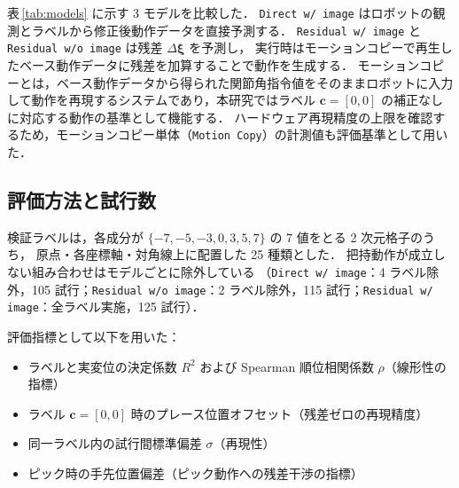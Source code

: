 表\,\ref{tab:models} に示す 3 モデルを比較した．
\texttt{Direct w/ image} はロボットの観測とラベルから修正後動作データを直接予測する．
\texttt{Residual w/ image} と \texttt{Residual w/o image} は残差 $\Delta\bm{\xi}$ を予測し，
実行時はモーションコピーで再生したベース動作データに残差を加算することで動作を生成する．
モーションコピーとは，ベース動作データから得られた関節角指令値をそのままロボットに入力して動作を再現するシステムであり，本研究ではラベル $\bm{c} = [0,0]$ の補正なしに対応する動作の基準として機能する．
ハードウェア再現精度の上限を確認するため，モーションコピー単体（\texttt{Motion Copy}）の計測値も評価基準として用いた．

\subsection{評価方法と試行数}

検証ラベルは，各成分が $\{-7, -5, -3, 0, 3, 5, 7\}$ の 7 値をとる 2 次元格子のうち，
原点・各座標軸・対角線上に配置した 25 種類とした．
把持動作が成立しない組み合わせはモデルごとに除外している
（\texttt{Direct w/ image}：4 ラベル除外，105 試行；\texttt{Residual w/o image}：2 ラベル除外，115 試行；\texttt{Residual w/ image}：全ラベル実施，125 試行）．

評価指標として以下を用いた：
\begin{itemize}
  \item ラベルと実変位の決定係数 $R^2$ および Spearman 順位相関係数 $\rho$（線形性の指標）
  \item ラベル $\bm{c} = [0,0]$ 時のプレース位置オフセット（残差ゼロの再現精度）
  \item 同一ラベル内の試行間標準偏差 $\sigma$（再現性）
  \item ピック時の手先位置偏差（ピック動作への残差干渉の指標）
\end{itemize}
